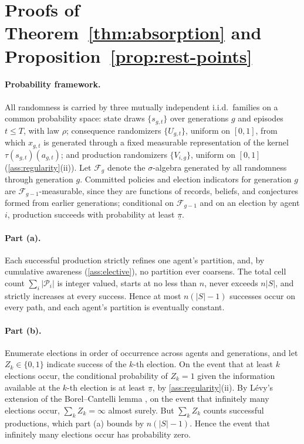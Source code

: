 \section{Proofs of Theorem~\ref{thm:absorption} and
Proposition~\ref{prop:rest-points}}
\label{app:absorption}

\paragraph{Probability framework.}
All randomness is carried by three mutually independent i.i.d.\ families on
a common probability space: state draws $\{s_{g,t}\}$ over generations $g$
and episodes $t\leq T$, with law $\rho$; consequence randomizers
$\{U_{g,t}\}$, uniform on $[0,1]$, from which $x_{g,t}$ is generated through
a fixed measurable representation of the kernel
$\tau(s_{g,t})(a_{g,t})$; and production randomizers $\{V_{i,g}\}$, uniform
on $[0,1]$ (\cref{ass:regularity}(ii)).  Let $\mathcal F_g$ denote the
$\sigma$-algebra generated by all randomness through generation $g$.
Committed policies and election indicators for generation $g$ are
$\mathcal F_{g-1}$-measurable, since they are functions of records, beliefs,
and conjectures formed from earlier generations; conditional on
$\mathcal F_{g-1}$ and on an election by agent $i$, production succeeds with
probability at least $\underline\pi$.

\paragraph{Part (a).}
Each successful production strictly refines one agent's partition, and, by
cumulative awareness (\cref{ass:elective}), no partition ever coarsens.  The
total cell count $\sum_i\lvert\mathcal P_i\rvert$ is integer valued, starts
at no less than $n$, never exceeds $n\lvert S\rvert$, and strictly increases
at every success.  Hence at most $n(\lvert S\rvert-1)$ successes occur on
every path, and each agent's partition is eventually constant.

\paragraph{Part (b).}
Enumerate elections in order of occurrence across agents and generations,
and let $Z_k\in\{0,1\}$ indicate success of the $k$-th election.  On the
event that at least $k$ elections occur, the conditional probability of
$Z_k=1$ given the information available at the $k$-th election is at least
$\underline\pi$, by \cref{ass:regularity}(ii).  By L\'evy's extension of
the Borel--Cantelli lemma \citep[Thm.~12.15]{Williams1991}, on the event
that infinitely many elections occur, $\sum_kZ_k=\infty$ almost surely.
But $\sum_kZ_k$ counts successful productions, which part (a) bounds by
$n(\lvert S\rvert-1)$.  Hence the event that infinitely many elections
occur has probability zero.

